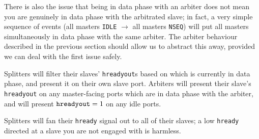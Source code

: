 There is also the issue that being in data phase with an arbiter does not mean you are genuinely in data phase with the arbitrated slave; in fact, a very simple sequence of events (all masters {\tt IDLE} $\to$ all masters {\tt NSEQ}) will put all masters simultaneously in data phase with the same arbiter. The arbiter behaviour described in the previous section should allow us to abstract this away, provided we can deal with the first issue safely.

Splitters will filter their slaves' {\tt hreadyout}s based on which is currently in data phase, and present it on their own slave port. Arbiters will present their slave's {\tt hreadyout} on any master-facing ports which are in data phase with the arbiter, and will present ${\tt hreadyout} = 1$ on any idle ports.

Splitters will fan their {\tt hready} signal out to all of their slaves; a low {\tt hready} directed at a slave you are not engaged with is harmless.



